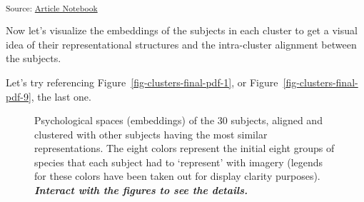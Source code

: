 \documentclass[
  authoryear]{elsarticle}
\begin{document}
\textsubscript{Source:
\href{https://m-delem.github.io/2499-similarity-manuscript/index.qmd.html}{Article
Notebook}}

Now let's visualize the embeddings of the subjects in each cluster to
get a visual idea of their representational structures and the
intra-cluster alignment between the subjects.

Let's try referencing {Figure~\ref{fig-clusters-final-pdf-1}}, or
{Figure~\ref{fig-clusters-final-pdf-9}}, the last one.

\begin{figure}

\caption{\label{fig-clusters-final-pdf}Psychological spaces (embeddings)
of the 30 subjects, aligned and clustered with other subjects having the
most similar representations. The eight colors represent the initial
eight groups of species that each subject had to `represent' with
imagery (legends for these colors have been taken out for display
clarity purposes). \textbf{\emph{Interact with the figures to see the
details.}}}

\begin{minipage}{0.33\linewidth}



\end{minipage}%
%
\begin{minipage}{0.33\linewidth}

\centering{

}
\end{minipage}
\end{figure}
\end{document}
